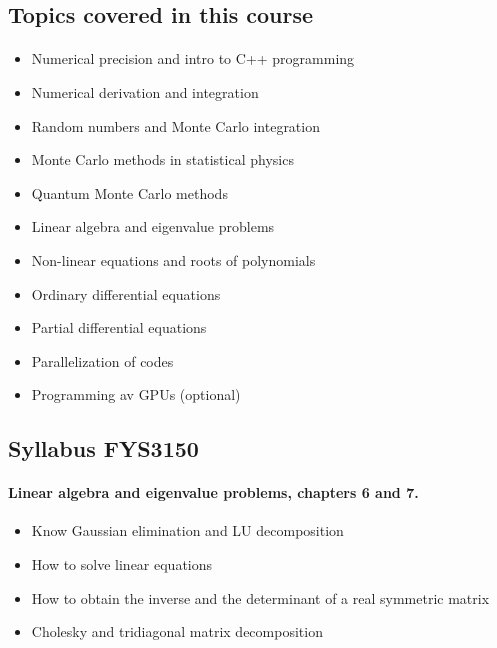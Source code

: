 \documentclass[%
twoside,                 %
final,                   %
10pt]{article}
\begin{document}
\noindent



\subsection*{Topics covered in this course}


\paragraph{}
\begin{itemize}
  \item Numerical precision and intro to C++ programming

  \item Numerical derivation and integration

  \item Random numbers and Monte Carlo integration

  \item Monte Carlo methods in statistical physics

  \item Quantum Monte Carlo methods

  \item Linear algebra and eigenvalue problems

  \item Non-linear equations and roots of polynomials

  \item Ordinary differential equations

  \item Partial differential equations

  \item Parallelization of codes

  \item Programming av GPUs (optional)
\end{itemize}

\noindent




\subsection*{Syllabus FYS3150}


\paragraph{Linear algebra and eigenvalue problems, chapters 6 and 7.}
\begin{itemize}
  \item Know Gaussian elimination and LU decomposition

  \item How to solve linear equations

  \item How to obtain the inverse and the determinant of a real symmetric matrix

  \item Cholesky and tridiagonal matrix decomposition
\end{itemize}
\end{document}

